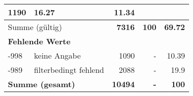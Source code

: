 \begin{longtable}{lXrrr}
       \num{1190} &
       \num[round-mode=places,round-precision=2]{16,27} &
         \num[round-mode=places,round-precision=2]{11,34} \\
     \midrule
     \multicolumn{2}{l}{Summe (gültig)} &
       \textbf{\num{7316}} &
     \textbf{100} &
       \textbf{\num[round-mode=places,round-precision=2]{69,72}} \\
     \multicolumn{5}{l}{\textbf{Fehlende Werte}}\\
       -998 &
       keine Angabe &
         \num{1090} &
        - &
         \num[round-mode=places,round-precision=2]{10,39} \\
       -989 &
       filterbedingt fehlend &
         \num{2088} &
        - &
         \num[round-mode=places,round-precision=2]{19,9} \\
     \midrule
     \multicolumn{2}{l}{\textbf{Summe (gesamt)}} &
          \textbf{\num{10494}} &
        \textbf{-} &
        \textbf{100} \\
     \bottomrule
     \end{longtable}
     
